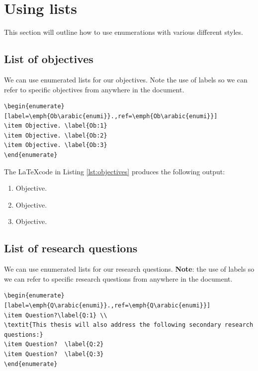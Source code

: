 \section{Using lists}\label{sec:using-lists}
This section will outline how to use enumerations with various different styles.

\subsection{List of objectives}\label{sec:objective-list}
We can use enumerated lists for our objectives. Note the use of labels so we can refer to specific objectives from anywhere in the document.

\begin{lstlisting}[caption={Objectives enumeration}, numbers=none, label={lst:objectives}]
\begin{enumerate}[label=\emph{Ob\arabic{enumi}}.,ref=\emph{Ob\arabic{enumi}}]
\item Objective. \label{Ob:1}
\item Objective. \label{Ob:2}
\item Objective. \label{Ob:3} 
\end{enumerate}
\end{lstlisting}

The \LaTeX code in Listing \ref{lst:objectives} produces the following output:

\begin{mdframed}
\begin{enumerate}[label=\emph{Ob\arabic{enumi}}.,ref=\emph{Ob\arabic{enumi}}]
	\item Objective. \label{Ob:1}
	\item Objective. \label{Ob:2}
	\item Objective. \label{Ob:3} 
\end{enumerate}
\end{mdframed}

\subsection{List of research questions}\label{sec:second-subsection}
We can use enumerated lists for our research questions. \textbf{Note}: the use of labels so we can refer to specific research questions from anywhere in the document.

\begin{lstlisting}[caption={Question enumeration}, numbers=none, label={lst:questions}]
\begin{enumerate}[label=\emph{Q\arabic{enumi}}.,ref=\emph{Q\arabic{enumi}}]
\item Question?\label{Q:1} \\
\textit{This thesis will also address the following secondary research questions:}
\item Question?  \label{Q:2}
\item Question?  \label{Q:3}
\end{enumerate}
\end{lstlisting}

